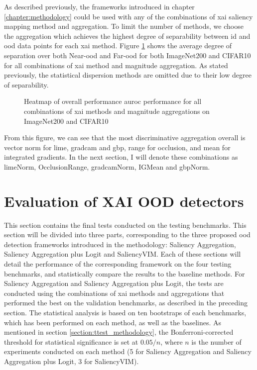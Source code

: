 \documentclass[UKenglish]{uiomasterthesis} %
\theoremstyle{definition}
\begin{document}
As described previously, the frameworks introduced in chapter \ref{chapter:methodology} could be used with any of the combinations of \ac{xai} saliency mapping method and aggregation. To limit the number of methods, we choose the aggregation which achieves the highest degree of separability between \ac{id} and \ac{ood} data points for each \ac{xai} method. Figure \ref{fig:both_heatmap} shows the average degree of separation over both Near-\ac{ood} and Far-\ac{ood} for both ImageNet200 and CIFAR10 for all combinations of \ac{xai} method and magnitude aggregation. As stated previously, the statistical dispersion methods are omitted due to their low degree of separability.

\begin{figure}[hbtp]
    \begin{center}
        
    \end{center}
    \caption[Overall performance on ImageNet200 and CIFAR10]{Heatmap of overall performance \ac{auroc} performance for all combinations of \ac{xai} methods and magnitude aggregations on ImageNet200 and CIFAR10}
    \label{fig:both_heatmap}
\end{figure}


From this figure, we can see that the most discriminative aggregation overall is vector norm for \ac{lime}, \ac{gradcam} and \ac{gbp}, range for occlusion, and mean for integrated gradients. In the next section, I will denote these combinations as \ac{lime}Norm, OcclusionRange, \ac{gradcam}Norm, IGMean and \ac{gbp}Norm.

\section{Evaluation of XAI OOD detectors} \label{section:results}

This section contains the final tests conducted on the testing benchmarks. This section will be divided into three parts, corresponding to the three proposed \ac{ood} detection frameworks introduced in the methodology: Saliency Aggregation, Saliency Aggregation plus Logit and SaliencyVIM. Each of these sections will detail the performance of the corresponding framework on the four testing benchmarks, and statistically compare the results to the baseline methods. For Saliency Aggregation and Saliency Aggregation plus Logit, the tests are conducted using the combinations of \ac{xai} methods and aggregations that performed the best on the validation benchmarks, as described in the preceding section. The statistical analysis is based on ten bootstraps of each benchmarks, which has been performed on each method, as well as the baselines. As mentioned in section \ref{section:ttest_methodology}, the Bonferroni-corrected threshold for statistical significance is set at $0.05 / n$, where $n$ is the number of experiments conducted on each method (5 for Saliency Aggregation and Saliency Aggregation plus Logit, 3 for SaliencyVIM).
\end{document}
